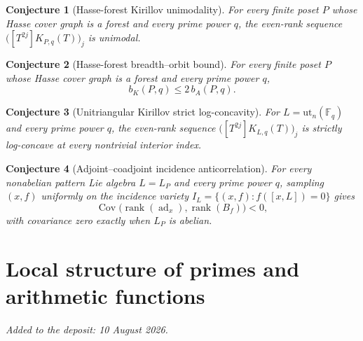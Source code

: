 \documentclass[11pt]{article}
\newtheorem{conjecture}{Conjecture}
\theoremstyle{definition}
\newcommand{\rank}{\operatorname{rank}}
\newcommand{\Fq}{\mathbb F}
\begin{document}
\begin{conjecture}[Hasse-forest Kirillov unimodality]\label{v17}
For every finite poset $P$ whose Hasse cover graph is a forest and every prime power $q$, the even-rank sequence $\bigl([T^{2j}]K_{P,q}(T)\bigr)_j$ is unimodal.
\end{conjecture}

\begin{conjecture}[Hasse-forest breadth--orbit bound]\label{v18}
For every finite poset $P$ whose Hasse cover graph is a forest and every prime power $q$,
\[
b_K(P,q)\le 2\,b_A(P,q).
\]
\end{conjecture}

\begin{conjecture}[Unitriangular Kirillov strict log-concavity]\label{v19}
For $L=\mathrm{ut}_n(\Fq_q)$ and every prime power $q$, the even-rank sequence $\bigl([T^{2j}]K_{L,q}(T)\bigr)_j$ is strictly log-concave at every nontrivial interior index.
\end{conjecture}

\begin{conjecture}[Adjoint--coadjoint incidence anticorrelation]\label{v20}
For every nonabelian pattern Lie algebra $L=L_P$ and every prime power $q$, sampling $(x,f)$ uniformly on the incidence variety $I_L=\{(x,f):f([x,L])=0\}$ gives
\[
\operatorname{Cov}\bigl(\rank(\operatorname{ad}_x),\rank(B_f)\bigr)<0,
\]
with covariance zero exactly when $L_P$ is abelian.
\end{conjecture}


\part{Local structure of primes and arithmetic functions}

\medskip\noindent\emph{Added to the deposit: 10 August 2026.}\par\medskip
\end{document}
